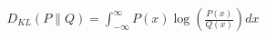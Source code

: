 \documentclass[preview]{standalone}
\begin{document}
\begin{align*}
D_{KL}(P \| Q) = \int_{-\infty}^{\infty} P(x) \log\left(\frac{P(x)}{Q(x)}\right) dx
\end{align*}
\end{document}
